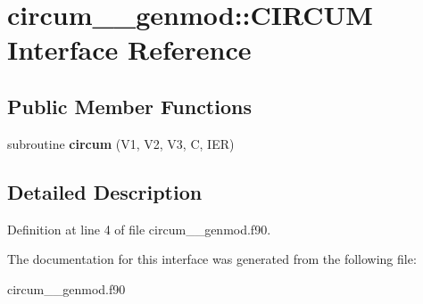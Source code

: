 \hypertarget{interfacecircum____genmod_1_1_c_i_r_c_u_m}{\section{circum\+\_\+\+\_\+genmod\+:\+:C\+I\+R\+C\+U\+M Interface Reference}
\label{interfacecircum____genmod_1_1_c_i_r_c_u_m}
}
\subsection*{Public Member Functions}
\begin{DoxyCompactItemize}
\item 
\hypertarget{interfacecircum____genmod_1_1_c_i_r_c_u_m_a99d3c107e8c26f8d004508b58596a816}{subroutine {\bfseries circum} (V1, V2, V3, C, I\+E\+R)}\label{interfacecircum____genmod_1_1_c_i_r_c_u_m_a99d3c107e8c26f8d004508b58596a816}

\end{DoxyCompactItemize}


\subsection{Detailed Description}


Definition at line 4 of file circum\+\_\+\+\_\+genmod.\+f90.



The documentation for this interface was generated from the following file\+:\begin{DoxyCompactItemize}
\item 
circum\+\_\+\+\_\+genmod.\+f90\end{DoxyCompactItemize}
